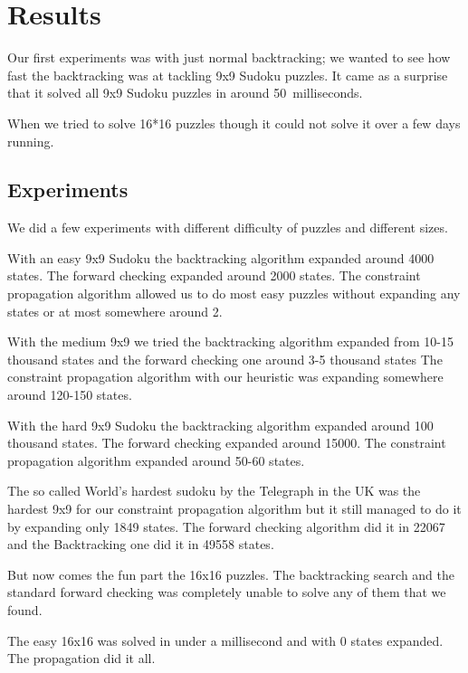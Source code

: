\documentclass[12pt,a4paper]{article}
\begin{document}
\section*{Results}%

Our first experiments was with just normal backtracking; we wanted to see how fast
the backtracking was at tackling 9x9 Sudoku puzzles. It came as a surprise that
it solved all 9x9 Sudoku puzzles in around 50~milliseconds.

When we tried to solve 16*16 puzzles though it could not solve it over a few days
running.

\subsection*{Experiments}

We did a few experiments with different difficulty of puzzles and different sizes.

With an easy 9x9 Sudoku the backtracking algorithm expanded around 4000 states.
The forward checking expanded around 2000 states. The constraint propagation 
algorithm allowed us to do most easy puzzles without expanding any states or at most
somewhere around 2.

With the medium 9x9 we tried the backtracking algorithm expanded
from 10-15 thousand states and the forward checking one around 3-5 thousand states
The constraint propagation algorithm with our heuristic was expanding somewhere around 120-150 states.

With the hard 9x9 Sudoku the backtracking algorithm expanded around 100 thousand
states. The forward checking expanded around 15000. The constraint propagation
algorithm expanded around 50-60 states.

The so called World's hardest sudoku by the Telegraph in the UK was the hardest 9x9
for our constraint propagation algorithm but it still managed to do it by expanding
only 1849 states. The forward checking algorithm did it in 22067 and the Backtracking one
did it in 49558 states.

But now comes the fun part the 16x16 puzzles. The backtracking search and the 
standard forward checking was completely unable to solve any of them that we found.

The easy 16x16 was solved in under a millisecond and with 0 states expanded.
The propagation did it all.
\end{document}
